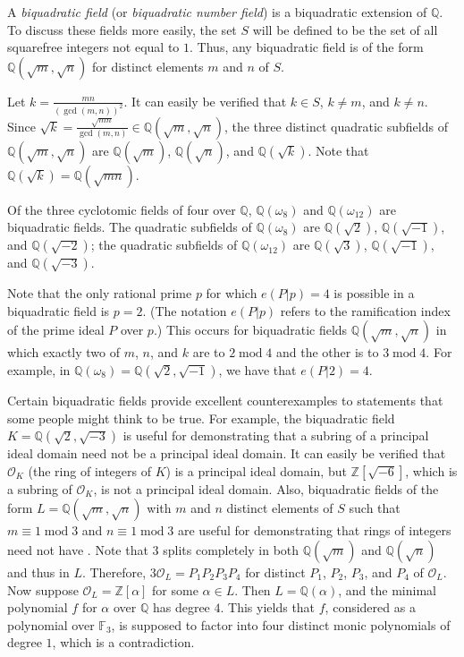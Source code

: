 \documentclass[12pt]{article}
\begin{document}
A {\sl biquadratic field\/} (or {\sl biquadratic number field\/}) is a biquadratic extension of $\mathbb{Q}$.  To discuss these fields more easily, the set $S$ will be defined to be the set of all squarefree integers not equal to $1$.  Thus, any biquadratic field is of the form $\mathbb{Q}(\sqrt{m}, \sqrt{n})$ for distinct elements $m$ and $n$ of $S$.

Let $\displaystyle k=\frac{mn}{(\gcd(m,n))^2}$.  It can easily be verified that $k \in S$, $k \neq m$, and $k \neq n$.  Since $\displaystyle \sqrt{k}=\frac{\sqrt{mn}}{\gcd(m,n)} \in \mathbb{Q}(\sqrt{m}, \sqrt{n})$, the three distinct quadratic subfields of $\mathbb{Q}(\sqrt{m}, \sqrt{n})$ are $\mathbb{Q}(\sqrt{m})$, $\mathbb{Q}(\sqrt{n})$, and $\mathbb{Q}(\sqrt{k})$.  Note that $\mathbb{Q}(\sqrt{k})=\mathbb{Q}(\sqrt{mn})$.

Of the three cyclotomic fields of  four over $\mathbb{Q}$, $\mathbb{Q}(\omega_8)$ and $\mathbb{Q}(\omega_{12})$ are biquadratic fields.  The quadratic subfields of $\mathbb{Q}(\omega_8)$ are $\mathbb{Q}(\sqrt{2})$, $\mathbb{Q}(\sqrt{-1})$, and $\mathbb{Q}(\sqrt{-2})$; the quadratic subfields of $\mathbb{Q}(\omega_{12})$ are $\mathbb{Q}(\sqrt{3})$, $\mathbb{Q}(\sqrt{-1})$, and $\mathbb{Q}(\sqrt{-3})$.

Note that the only rational prime $p$ for which $e(P|p)=4$ is possible in a biquadratic field is $p=2$.  (The notation $e(P|p)$ refers to the ramification index of the prime ideal $P$ over $p$.)  This occurs for biquadratic fields $\mathbb{Q}(\sqrt{m}, \sqrt{n})$ in which exactly two of $m$, $n$, and $k$ are  to $2 \operatorname{mod} 4$ and the other is  to $3 \operatorname{mod} 4$.  For example, in $\mathbb{Q}(\omega_8)=\mathbb{Q}(\sqrt{2}, \sqrt{-1})$, we have that $e(P|2)=4$.

Certain biquadratic fields provide excellent counterexamples to statements that some people might think to be true.  For example, the biquadratic field $K=\mathbb{Q}(\sqrt{2}, \sqrt{-3})$ is useful for demonstrating that a subring of a principal ideal domain need not be a principal ideal domain.  It can easily be verified that $\mathcal{O}_K$ (the ring of integers of $K$) is a principal ideal domain, but $\mathbb{Z}[\sqrt{-6}]$, which is a subring of $\mathcal{O}_K$, is not a principal ideal domain.  Also, biquadratic fields of the form $L=\mathbb{Q}(\sqrt{m}, \sqrt{n})$ with $m$ and $n$ distinct elements of $S$ such that $m \equiv 1 \operatorname{mod} 3$ and $n \equiv 1 \operatorname{mod} 3$ are useful for demonstrating that rings of integers need not have .  Note that $3$ splits completely in both $\mathbb{Q}(\sqrt{m})$ and $\mathbb{Q}(\sqrt{n})$ and thus in $L$.  Therefore, $3\mathcal{O}_L=P_1P_2P_3P_4$ for distinct  $P_1$, $P_2$, $P_3$, and $P_4$ of $\mathcal{O}_L$.  Now suppose $\mathcal{O}_L=\mathbb{Z}[\alpha]$ for some $\alpha \in L$.  Then $L=\mathbb{Q}(\alpha)$, and the minimal polynomial $f$ for $\alpha$ over $\mathbb{Q}$ has degree $4$.  This yields that $f$, considered as a polynomial over $\mathbb{F}_3$, is supposed to factor into four distinct monic polynomials of degree $1$, which is a contradiction.
\end{document}
